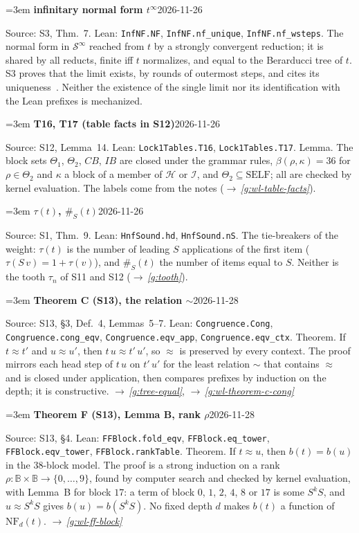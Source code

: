 \documentclass[11pt]{amsart}
\makeatletter
\newcommand{\Ter}{\mathcal S}
\newcommand{\Hc}{\mathcal H}
\newcommand{\Ic}{\mathcal I}
\newcommand{\Self}{\mathrm{SELF}}
\newcounter{sense}
\newenvironment{entry}[3]{%
  \par\addvspace{\medskipamount}\noindent\phantomsection
  \def\@currentlabel{#2}\label{#1}\setcounter{sense}{0}\raggedright\emergencystretch=3em%
  \textbf{#2}\hfill{\footnotesize\textsf{#3}}\par\nopagebreak\noindent\ignorespaces}%
  {\par}
\newcommand{\src}[1]{\textsf{Source:} #1.\enskip}
\newcommand{\lean}[1]{\textsf{Lean:} #1.\enskip}
\renewcommand{\see}[1]{$\rightarrow$\,\emph{\ref{#1}}}
\makeatother
\begin{document}
\begin{entry}{g:t-infty}{infinitary normal form $t^{\infty}$}{2026-11-26}
\src{S3, Thm.~7}
\lean{\texttt{InfNF.NF}, \texttt{InfNF.nf\_unique}, \texttt{InfNF.nf\_wsteps}}
The normal form in $\Ter^{\infty}$ reached from $t$ by a strongly convergent reduction; it is shared by
all reducts, finite iff $t$ normalizes, and equal to the Berarducci tree of $t$. S3 proves that the
limit exists, by rounds of outermost steps, and cites its uniqueness~\citep{kksv,terese}. Neither the
existence of the single limit nor its identification with the Lean prefixes is mechanized.
\end{entry}

\begin{entry}{g:t16-t17}{T16, T17 (table facts in S12)}{2026-11-26}
\src{S12, Lemma~14}
\lean{\texttt{Lock1Tables.T16}, \texttt{Lock1Tables.T17}}
Lemma. The block sets $\Theta_1$, $\Theta_2$, $CB$, $IB$ are closed under the grammar rules,
$\beta(\rho,\kappa)=36$ for $\rho\in\Theta_2$ and $\kappa$ a block of a member of $\Hc$ or $\Ic$, and
$\Theta_2\subseteq\Self$; all are checked by kernel evaluation. The labels come from the notes
(\see{g:wl-table-facts}).
\end{entry}

\begin{entry}{g:sym-tau}{$\tau(t)$, $\#_S(t)$}{2026-11-26}
\src{S1, Thm.~9}
\lean{\texttt{HnfSound.hd}, \texttt{HnfSound.nS}}
The tie-breakers of the weight: $\tau(t)$ is the number of leading $S$ applications of the first item
($\tau(S\,v)=1+\tau(v)$), and $\#_S(t)$ the number of items equal to $S$. Neither is the tooth $\tau_n$
of S11 and S12 (\see{g:tooth}).
\end{entry}

\begin{entry}{g:theorem-c-s13}{Theorem C (S13), the relation $\sim$}{2026-11-28}
\src{S13, \S3, Def.~4, Lemmas~5--7}
\lean{\texttt{Congruence.Cong}, \texttt{Congruence.cong\_eqv}, \texttt{Congruence.eqv\_app}, \texttt{Congruence.eqv\_ctx}}
Theorem. If $t\approx t'$ and $u\approx u'$, then $t\,u\approx t'\,u'$, so $\approx$ is preserved by every
context. The proof mirrors each head step of $t\,u$ on $t'\,u'$ for the least relation $\sim$ that
contains $\approx$ and is closed under application, then compares prefixes by induction on the depth;
it is constructive. \see{g:tree-equal}, \see{g:wl-theorem-c-cong}
\end{entry}

\begin{entry}{g:theorem-f}{Theorem F (S13), Lemma B, rank $\rho$}{2026-11-28}
\src{S13, \S4}
\lean{\texttt{FFBlock.fold\_eqv}, \texttt{FFBlock.eq\_tower}, \texttt{FFBlock.eqv\_tower}, \texttt{FFBlock.rankTable}}
Theorem. If $t\approx u$, then $b(t)=b(u)$ in the 38-block model. The proof is a strong induction on a
rank $\rho\colon\mathbb B\times\mathbb B\to\{0,\dots,9\}$, found by computer search and checked by kernel
evaluation, with Lemma~B for block $17$: a term of block $0$, $1$, $2$, $4$, $8$ or $17$ is some $S^kS$,
and $u\approx S^kS$ gives $b(u)=b(S^kS)$. No fixed depth $d$ makes $b(t)$ a function of
$\mathrm{NF}_d(t)$. \see{g:wl-ff-block}
\end{entry}
\end{document}
